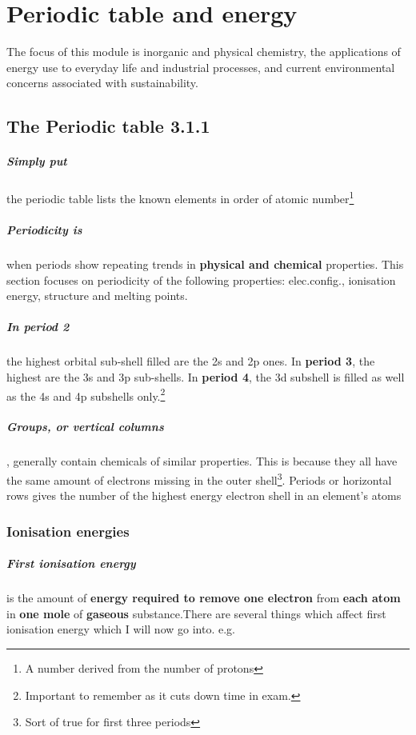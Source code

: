 \chapter{Periodic table and energy}
	The focus of this module is inorganic and physical chemistry, the applications of energy use to everyday life and industrial processes, and current environmental concerns associated with sustainability. 

\section{The Periodic table 3.1.1}
	
	\paragraph{Simply put} the periodic table lists the known elements in order of atomic number\footnote{A number derived from the number of protons} 
    \paragraph{Periodicity is} when periods show repeating trends
in \textbf{physical and chemical} properties. This section focuses on periodicity of the following properties: elec.config., ionisation energy, structure and melting points.
\paragraph{In period 2} the highest orbital sub-shell filled are the 2s and 2p ones. In \textbf{period 3}, the highest are the 3s and 3p sub-shells. In \textbf{period 4}, the 3d subshell is filled as well as the 4s and 4p subshells only.\footnote{Important to remember as it cuts down time in exam.}

	
	\paragraph{Groups, or vertical columns}, generally contain chemicals of similar properties.
	This is because they all have the same amount of electrons missing in the outer shell\footnote{Sort of true for first three periods}. 
    Periods or horizontal rows gives the number of the highest energy electron shell in an element's atoms
	\subsection*{Ionisation energies}
	\paragraph{First ionisation energy} is the amount of \textbf{energy required to remove one electron} from \textbf{each atom} in \textbf{one mole} of \textbf{gaseous} substance.There are several things which affect first ionisation energy which I will now go into.
    e.g. 
